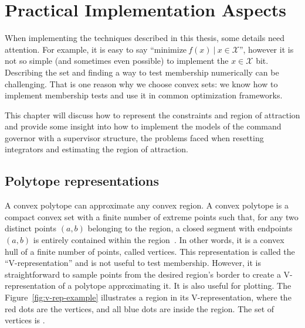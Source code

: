 
\chapter{Practical Implementation Aspects}%
\label{chp:practival-implementation-aspects}

When implementing the techniques described in this thesis, some details need
attention. For example, it is easy to say
\enquote{\(\mathrm{minimize}~f(x)~|~x\in\mathcal{X}\)}, however it is not so
simple (and sometimes even possible) to implement the \(x\in\mathcal{X}\) bit.
Describing the set and finding a way to test membership numerically can be
challenging. That is one reason why we choose convex sets: we know how to
implement membership tests and use it in common optimization frameworks.

This chapter will discuss how to represent the constraints and region of
attraction and provide some insight into how to implement the models of the
command governor with a supervisor structure, the problems faced when resetting
integrators and estimating the region of attraction.

\section{Polytope representations}%
\label{sec:polytope-representation}

A convex polytope can approximate any convex region. A convex polytope is a
compact convex set with a finite number of extreme points such that, for any two
distinct points \((a,b)\) belonging to the region, a closed segment with
endpoints \((a,b)\) is entirely contained within the
region~\parencite{grünbaum:convex}. In other words, it is a convex hull of a
finite number of points, called vertices. This representation is called the
\enquote{V-representation} and is not useful to test membership. However, it is
straightforward to sample points from the desired region's border to create a
V-representation of a polytope approximating it. It is also useful for plotting.
The Figure~\ref{fig:v-rep-example} illustrates a region in its V-representation,
where the red dots are the vertices, and all blue dots are inside the region.
The set of vertices is .

